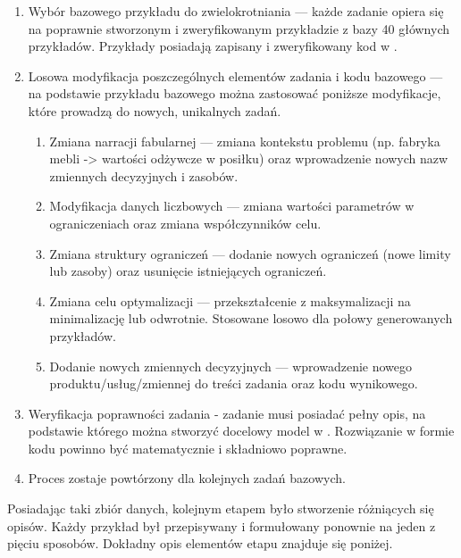 \begin{enumerate}
\item Wybór bazowego przykładu do zwielokrotniania --- każde zadanie opiera się na poprawnie stworzonym i zweryfikowanym przykładzie z bazy 40 głównych przykładów. Przykłady posiadają zapisany i zweryfikowany kod w .
\item Losowa modyfikacja poszczególnych elementów zadania i kodu bazowego --- na podstawie przykładu bazowego można zastosować poniższe modyfikacje, które prowadzą do nowych, unikalnych zadań.
\begin{enumerate}
\item Zmiana narracji fabularnej --- zmiana kontekstu problemu (np. fabryka mebli -> wartości odżywcze w posiłku) oraz wprowadzenie nowych nazw zmiennych decyzyjnych i zasobów.
\item Modyfikacja danych liczbowych --- zmiana wartości parametrów w ograniczeniach oraz zmiana współczynników celu.
\item Zmiana struktury ograniczeń --- dodanie nowych ograniczeń (nowe limity lub zasoby) oraz usunięcie istniejących ograniczeń.
\item Zmiana celu optymalizacji --- przekształcenie z maksymalizacji na minimalizację lub odwrotnie. Stosowane losowo dla połowy generowanych przykładów.
\item Dodanie nowych zmiennych decyzyjnych --- wprowadzenie nowego produktu/usług/zmiennej do treści zadania oraz kodu wynikowego.
\end{enumerate}
\item Weryfikacja poprawności zadania - zadanie musi posiadać pełny opis, na podstawie którego można stworzyć docelowy model w . Rozwiązanie w formie kodu powinno być matematycznie i składniowo poprawne.
\item Proces zostaje powtórzony dla kolejnych zadań bazowych.
\end{enumerate}

Posiadając taki zbiór danych, kolejnym etapem było stworzenie różniących się opisów. Każdy przykład był przepisywany i formułowany ponownie na jeden z pięciu sposobów. Dokładny opis elementów etapu znajduje się poniżej.

